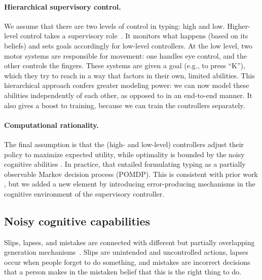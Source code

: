 \paragraph{Hierarchical supervisory control.} 
We assume that there are two levels of control in typing: high and low.
Higher-level control takes a supervisory role~\cite{botvinick2012hierarchical, frank2012mechanisms}. 
It monitors what happens (based on its beliefs) and sets goals accordingly for low-level controllers.
At the low level, two motor systems are responsible for movement: one handles eye control, and the other controls the fingers.
These systems are given a goal (e.g., to press ``K''), which they try to reach in a way that factors in their own, limited abilities.
This hierarchical approach confers greater modeling power: we can now model these abilities independently of each other, as opposed to in an end-to-end manner.
It also gives a boost to training, because we can train the controllers separately.


\paragraph{Computational rationality.} 
The final assumption is that the (high- and low-level) controllers adjust their policy to maximize expected utility,
while optimality is bounded by the noisy cognitive abilities \cite{oulasvirta2022computational}. 
In practice, that entailed formulating typing as a partially observable Markov decision process (POMDP). This is consistent with prior work \cite{jokinen2017modelling,jokinen2021touchscreen},
but we added a new element by introducing error-producing mechanisms in the cognitive environment of the supervisory controller. 

\subsection{Noisy cognitive capabilities}
\label{sec:errors-generating}

Slips, lapses, and mistakes are connected with different but partially overlapping generation mechanisms~\cite{reason1990human}. 
Slips are unintended and uncontrolled actions, lapses occur when people forget to do something, and mistakes are incorrect decisions that a person makes in the mistaken belief that this is the right thing to do. 

